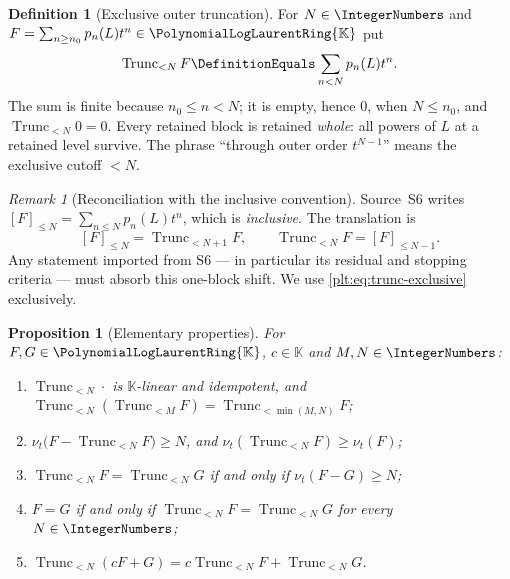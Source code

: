\documentclass[11pt,oneside]{article}
\theoremstyle{plain}
\newtheorem{proposition}[theorem]{Proposition}
\theoremstyle{definition}
\newtheorem{definition}[theorem]{Definition}
\theoremstyle{remark}
\newtheorem{remark}[theorem]{Remark}
\newcommand{\K}{\mathbb{K}}
\newcommand{\PLlau}{\PolynomialLogLaurentRing{\K}}       %
\newcommand{\ordt}{\nu_{t}}                              %
\newcommand{\Trunc}[2]{\operatorname{Trunc}_{<#2}#1}     %
\begin{document}
\begin{definition}[Exclusive outer truncation]
\label{plt:def:trunc-exclusive}
For \(N\in\IntegerNumbers\) and \(F=\sum_{n\ge n_0}p_n(L)t^n\in\PLlau\) put
\begin{equation}\label{plt:eq:trunc-exclusive}
  \Trunc{F}{N}\DefinitionEquals\sum_{n<N}p_n(L)t^n .
\end{equation}
The sum is finite because \(n_0\le n<N\); it is empty, hence \(0\), when
\(N\le n_0\), and \(\Trunc{0}{N}=0\).  Every retained block is retained
\emph{whole}: all powers of \(L\) at a retained level survive.  The phrase
``through outer order \(t^{N-1}\)'' means the exclusive cutoff \(<N\).
\end{definition}

\begin{remark}[Reconciliation with the inclusive convention]
\label{plt:rmk:trunc-inclusive}
Source~S6 writes \([F]_{\le N}=\sum_{n\le N}p_n(L)t^n\), which is
\emph{inclusive}.  The translation is
\begin{equation}\label{plt:eq:trunc-inclusive-dictionary}
  [F]_{\le N}=\Trunc{F}{N+1},
  \qquad
  \Trunc{F}{N}=[F]_{\le N-1}.
\end{equation}
Any statement imported from S6 --- in particular its residual and stopping
criteria --- must absorb this one-block shift.  We use
\eqref{plt:eq:trunc-exclusive} exclusively.
\end{remark}

\begin{proposition}[Elementary properties]
\label{plt:prop:trunc-basic}
For \(F,G\in\PLlau\), \(c\in\K\) and \(M,N\in\IntegerNumbers\):
\begin{enumerate}[label=\textup{(\roman*)}]
\item \(\Trunc{\cdot}{N}\) is \(\K\)-linear and idempotent, and
  \(\Trunc{(\Trunc{F}{M})}{N}=\Trunc{F}{\min(M,N)}\);
\item \(\ordt\bigl(F-\Trunc{F}{N}\bigr)\ge N\), and
  \(\ordt(\Trunc{F}{N})\ge\ordt(F)\);
\item \(\Trunc{F}{N}=\Trunc{G}{N}\) if and only if \(\ordt(F-G)\ge N\);
\item \(F=G\) if and only if \(\Trunc{F}{N}=\Trunc{G}{N}\) for every
  \(N\in\IntegerNumbers\);
\item \(\Trunc{(cF+G)}{N}=c\Trunc{F}{N}+\Trunc{G}{N}\).
\end{enumerate}
\end{proposition}
\end{document}
